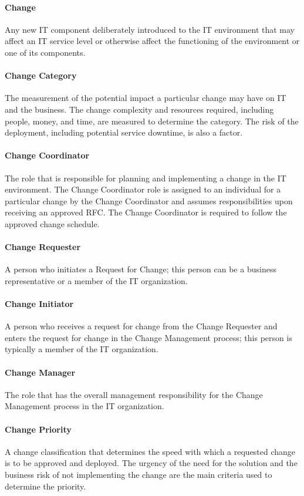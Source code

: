 \documentclass[a4]{article}
\begin{document}
\begin{multicols}{3}
    \paragraph{Change} Any new IT component deliberately introduced to the IT environment that may affect an IT
    service level or otherwise affect the functioning of the environment or one of its components.
    \paragraph{Change Category} The measurement of the potential impact a particular change may have on IT and the
    business. The change complexity and resources required, including people, money, and time, are
    measured to determine the category. The risk of the deployment, including potential service downtime, is
    also a factor.
    \paragraph{Change Coordinator} The role that is responsible for planning and implementing a change in the IT
    environment. The Change Coordinator role is assigned to an individual for a particular change by the
    Change Coordinator and assumes responsibilities upon receiving an approved RFC. The Change
    Coordinator is required to follow the approved change schedule.
    \paragraph{Change Requester} A person who initiates a Request for Change; this person can be a business
    representative or a member of the IT organization.
    \paragraph{Change Initiator} A person who receives a request for change from the Change Requester and enters
    the request for change in the Change Management process; this person is typically a member of the IT
    organization.
    \paragraph{Change Manager} The role that has the overall management responsibility for the Change Management
    process in the IT organization.
    \paragraph{Change Priority} A change classification that determines the speed with which a requested change is to
    be approved and deployed. The urgency of the need for the solution and the business risk of not
    implementing the change are the main criteria used to determine the priority.

\end{multicols}
\end{document}
